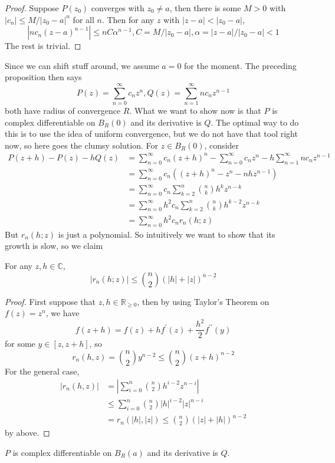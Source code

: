 \begin{proof}
    Suppose $P(z_0)$ converges with $z_0\neq a$, then there is some $M>0$ with $|c_n|\le M/|z_0-a|^n$ for all $n$.
    Then for any $z$ with $|z-a|<|z_0-a|$,
    $$|nc_n(z-a)^{n-1}|\le nC\alpha^{n-1},C=M/|z_0-a|,\alpha=|z-a|/|z_0-a|<1$$
    The rest is trivial.
\end{proof}
Since we can shift stuff around, we assume $a=0$ for the moment.
The preceding proposition then says
$$P(z)=\sum_{n=0}^\infty c_nz^n,Q(z)=\sum_{n=1}^\infty nc_nz^{n-1}$$
both have radius of convergence $R$.
What we want to show now is that $P$ is complex differentiable on $B_R(0)$ and its derivative is $Q$.
The optimal way to do this is to use the idea of uniform convergence, but we do not have that tool right now, so here goes the clumsy solution.
For $z\in B_R(0)$, consider
\begin{align*}
    P(z+h)-P(z)-hQ(z)&=\sum_{n=0}^\infty c_n(z+h)^n-\sum_{n=0}^\infty c_nz^n-h\sum_{n=1}^\infty nc_nz^{n-1}\\
    &=\sum_{n=0}^\infty c_n((z+h)^n-z^n-nhz^{n-1})\\
    &=\sum_{n=0}^\infty c_n\sum_{k=2}^n\binom{n}{k}h^kz^{n-k}\\
    &=\sum_{n=0}^\infty h^2c_n\sum_{k=2}^n\binom{n}{k}h^{k-2}z^{n-k}\\
    &=\sum_{n=0}^\infty h^2c_nr_n(h;z)
\end{align*}
But $r_n(h;z)$ is just a polynomial.
So intuitively we want to show that its growth is slow, so we claim
\begin{lemma}
    For any $z,h\in\mathbb C$,
    $$|r_n(h;z)|\le\binom{n}{2}(|h|+|z|)^{n-2}$$
\end{lemma}
\begin{proof}
    First suppose that $z,h\in\mathbb R_{\ge 0}$, then by using Taylor's Theorem on $f(z)=z^n$, we have
    $$f(z+h)=f(z)+hf^\prime(z)+\frac{h^2}{2}f^{\prime\prime}(y)$$
    for some $y\in [z,z+h]$, so
    $$r_n(h,z)=\binom{n}{2}y^{n-2}\le\binom{n}{2}(z+h)^{n-2}$$
    For the general case,
    \begin{align*}
        |r_n(h,z)|&=\left|\sum_{i=0}^n\binom{n}{2}h^{i-2}z^{n-i}\right|\\
        &\le\sum_{i=0}^n\binom{n}{2}|h|^{i-2}|z|^{n-i}\\
        &=r_n(|h|,|z|)\le\binom{n}{2}(|z|+|h|)^{n-2}
    \end{align*}
    by above.
\end{proof}
\begin{theorem}\label{tbt_diff}
    $P$ is complex differentiable on $B_R(a)$ and its derivative is $Q$.
\end{theorem}
